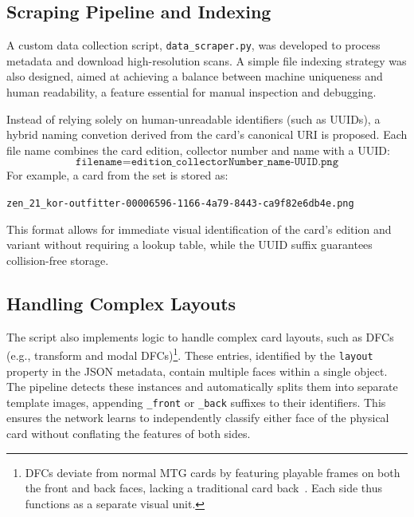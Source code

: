 \subsection{Scraping Pipeline and Indexing}
A custom data collection script, \texttt{data\_scraper.py}, was developed to process metadata and download high-resolution scans. A simple file indexing strategy was also designed, aimed at achieving a balance between machine uniqueness and human readability, a feature essential for manual inspection and debugging.

Instead of relying solely on human-unreadable identifiers (such as \acp{UUID}), a hybrid naming convetion derived from the card's canonical \ac{URI} is proposed. Each file name combines the card edition, collector number and name with a \ac{UUID}: 
\begin{equation}
    \texttt{filename} = \texttt{edition\_collectorNumber\_name-UUID.png}
\end{equation}
For example, a card from the  set is stored as:
\begin{center}
    \texttt{zen\_21\_kor-outfitter-00006596-1166-4a79-8443-ca9f82e6db4e.png}
\end{center}
This format allows for immediate visual identification of the card's edition and variant without requiring a lookup table, while the \ac{UUID} suffix guarantees collision-free storage.

\subsection{Handling Complex Layouts}
The script also implements logic to handle complex card layouts, such as \acp{DFC} (e.g., transform and modal \acp{DFC})\footnote{\acp{DFC} deviate from normal \ac{MTG} cards by featuring playable frames on both the front and back faces, lacking a traditional card back~\cite{mtg_rules}. Each side thus functions as a separate visual unit.}. These entries, identified by the \texttt{layout} property in the JSON metadata, contain multiple faces within a single object. The pipeline detects these instances and automatically splits them into separate template images, appending \texttt{\_front} or \texttt{\_back} suffixes to their identifiers. This ensures the network learns to independently classify either face of the physical card without conflating the features of both sides.

